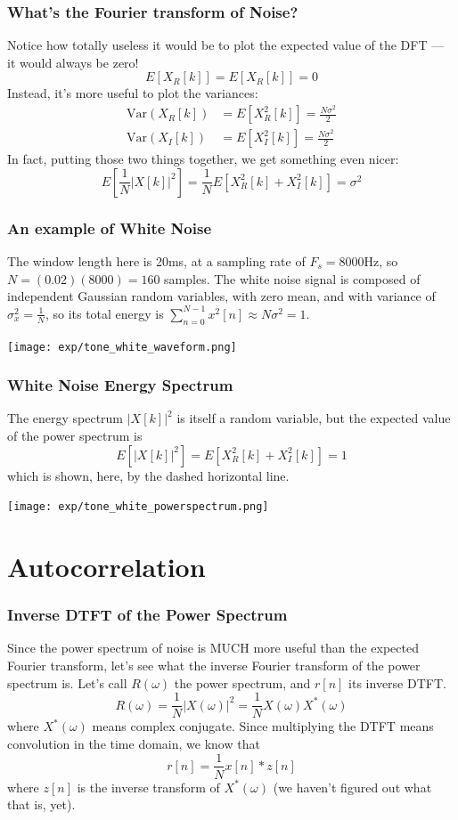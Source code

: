 \documentclass{beamer}
\begin{document}
\begin{frame}
  \frametitle{What's the Fourier transform of Noise?}

  Notice how totally useless it would be to plot the expected value of
  the DFT --- it would always be zero!
  \[
  E\left[X_R[k]\right]=E\left[X_R[k]\right]=0
  \]
  Instead, it's more useful to plot the variances:
  \begin{align*}
  \mbox{Var}\left(X_R[k]\right) &=E\left[X_R^2[k]\right]=\frac{N\sigma^2}{2}  \\
  \mbox{Var}\left(X_I[k]\right) &=E\left[X_I^2[k]\right]=\frac{N\sigma^2}{2}
  \end{align*}
  In fact, putting those two things together, we get something even nicer:
  \[
  E\left[\frac{1}{N}|X[k]|^2\right] = \frac{1}{N}E\left[X_R^2[k]+X_I^2[k]\right] = \sigma^2
  \]
\end{frame}

\begin{frame}
  \frametitle{An example of White Noise}

  The window length here is 20ms, at a sampling rate of $F_s=8000$Hz,
  so $N=(0.02)(8000)=160$ samples.  The white noise signal is composed
  of independent Gaussian random variables, with zero mean, and with
  variance of $\sigma_x^2=\frac{1}{N}$, so its total energy is
  $\sum_{n=0}^{N-1}x^2[n] \approx N\sigma^2 = 1$.
  
  \centerline{\texttt{[image: exp/tone\_white\_waveform.png]}}
\end{frame}

\begin{frame}
  \frametitle{White Noise Energy Spectrum}

  The energy spectrum $|X[k]|^2$ is itself a random variable, but the
  expected value of the power spectrum is
  \[
  E\left[|X[k]|^2\right] = E\left[X_R^2[k]+X_I^2[k]\right] = 1
  \]
  which is shown, here, by the dashed horizontal line.
  \centerline{\texttt{[image: exp/tone\_white\_powerspectrum.png]}}
\end{frame}

\section[Autocorrelation]{Autocorrelation}
\setcounter{subsection}{1}

\begin{frame}
  \frametitle{Inverse DTFT of the Power Spectrum}

  Since the power spectrum of noise is MUCH more useful than the
  expected Fourier transform, let's see what the inverse Fourier transform of the power spectrum
  is.  Let's call $R(\omega)$ the power spectrum, and $r[n]$ its inverse
  DTFT.
  \[
  R(\omega) = \frac{1}{N}|X(\omega)|^2 = \frac{1}{N}X(\omega)X^*(\omega)
  \]
  where $X^*(\omega)$ means complex conjugate.  Since multiplying the DTFT
  means convolution in the time domain, we know that
  \[
  r[n] = \frac{1}{N} x[n]\ast z[n]
  \]
  where $z[n]$ is the inverse transform of $X^*(\omega)$ (we haven't
  figured out what that is, yet).
\end{frame}
\end{document}
